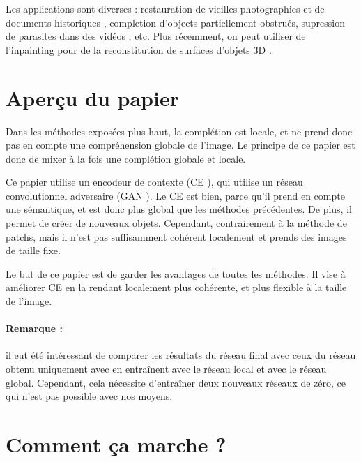 \documentclass[12pt]{article}
\begin{document}
Les applications sont diverses : restauration de vieilles photographies et de documents historiques \cite{bertalmio2000}, completion d'objects partiellement obstrués, supression de parasites dans des vidéos \cite{wexler2007}, etc. Plus récemment, on peut utiliser de l'inpainting pour de la reconstitution de surfaces d'objets 3D \cite{bobenko2005} \cite{harary2014}.

\section{Aperçu du papier}

Dans les méthodes exposées plus haut, la complétion est locale, et ne prend donc pas en compte une compréhension globale de l'image. Le principe de ce papier est donc de mixer à la fois une complétion globale et locale.

Ce papier utilise un encodeur de contexte (CE \cite{pathak2016}), qui utilise un réseau convolutionnel adversaire (GAN \cite{goodfellow2014}). Le CE est bien, parce qu'il prend en compte une sémantique, et est donc plus global que les méthodes précédentes. De plus, il permet de créer de nouveaux objets. Cependant, contrairement à la méthode de patchs, mais il n'est pas suffisamment cohérent localement et prends des images de taille fixe.

Le but de ce papier est de garder les avantages de toutes les méthodes. Il vise à améliorer CE en la rendant localement plus cohérente, et plus flexible à la taille de l'image.


\paragraph{Remarque :} il eut été intéressant de comparer les résultats du réseau final avec ceux du réseau obtenu uniquement avec en entraînent avec le réseau local et avec le réseau global. Cependant, cela nécessite d'entraîner deux nouveaux réseaux de zéro, ce qui n'est pas possible avec nos moyens.

\section{Comment ça marche ?}
\end{document}
